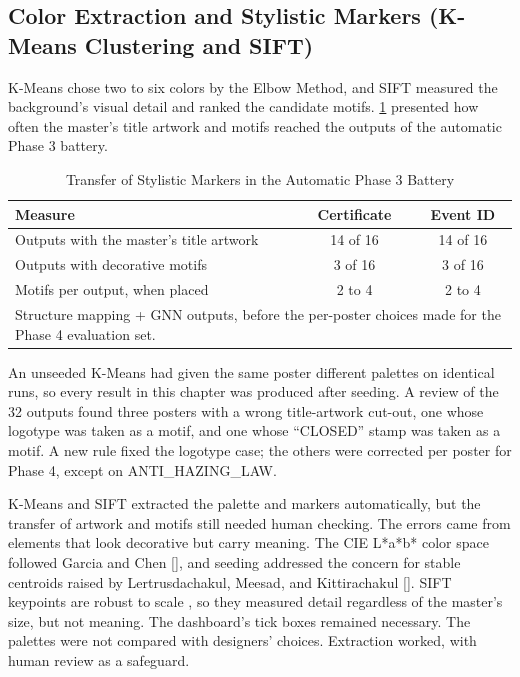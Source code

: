 \begin{refsection}
\clearpage
\subsection{Color Extraction and Stylistic Markers (K-Means Clustering and SIFT)}

K-Means chose two to six colors by the Elbow Method, and SIFT measured the background's visual detail and ranked the candidate motifs. \ref{tab:markers} presented how often the master's title artwork and motifs reached the outputs of the automatic Phase 3 battery.

\begin{table}[!ht]
\centering
\caption{Transfer of Stylistic Markers in the Automatic Phase 3 Battery}
\label{tab:markers}
\begin{tabular}{l c c}
\hline
\textbf{Measure} & \textbf{Certificate} & \textbf{Event ID} \\ \hline
Outputs with the master's title artwork & 14 of 16 & 14 of 16 \\
Outputs with decorative motifs & 3 of 16 & 3 of 16 \\
Motifs per output, when placed & 2 to 4 & 2 to 4 \\ \hline
\multicolumn{3}{p{0.80\textwidth}}{\footnotesize Structure mapping + GNN outputs, before the per-poster choices made for the Phase 4 evaluation set.}
\end{tabular}
\end{table}

An unseeded K-Means had given the same poster different palettes on identical runs, so every result in this chapter was produced after seeding. A review of the 32 outputs found three posters with a wrong title-artwork cut-out, one whose logotype was taken as a motif, and one whose ``CLOSED'' stamp was taken as a motif. A new rule fixed the logotype case; the others were corrected per poster for Phase 4, except on ANTI\_HAZING\_LAW.

K-Means and SIFT extracted the palette and markers automatically, but the transfer of artwork and motifs still needed human checking. The errors came from elements that look decorative but carry meaning. The CIE L*a*b* color space followed Garcia and Chen [\citeyear{Garcia2023}], and seeding addressed the concern for stable centroids raised by Lertrusdachakul, Meesad, and Kittirachakul [\citeyear{Lertrusdachakul2025Hybrid}]. SIFT keypoints are robust to scale \cite{Shaharom2023SIFT}, so they measured detail regardless of the master's size, but not meaning. The dashboard's tick boxes remained necessary. The palettes were not compared with designers' choices. Extraction worked, with human review as a safeguard.


\end{refsection}
